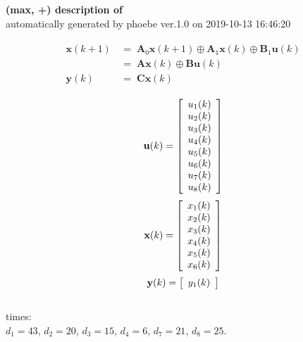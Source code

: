 \documentclass[11pt, a4paper, fleqn]{article}
\begin{document}
\noindent
\textbf{(max, +) description of} \texttt{\currfilebase} \\
automatically generated by phoebe ver.1.0 on 2019-10-13 16:46:20 

\begin{align}\begin{split}
\mathbf{x}(k+1) & \, = \; \mathbf{A}_{0}\mathbf{x}(k+1) \oplus \mathbf{A}_{1}\mathbf{x}(k) \oplus \mathbf{B}_{1}\mathbf{u}(k)\\
& \, = \; \mathbf{Ax}(k) \oplus \mathbf{Bu}(k)\\
\mathbf{y}(k) & \, = \; \mathbf{Cx}(k)
\end{split}\end{align}

\begin{equation*}
\mathbf{u}(k) = 
\left[\begin{array}{*{20}c}
  u_1(k) \\
  u_2(k) \\
  u_3(k) \\
  u_4(k) \\
  u_5(k) \\
  u_6(k) \\
  u_7(k) \\
  u_8(k) \\
\end{array}\right]
\end{equation*}
\begin{equation*}
\mathbf{x}(k) = 
\left[\begin{array}{*{20}c}
  x_1(k) \\
  x_2(k) \\
  x_3(k) \\
  x_4(k) \\
  x_5(k) \\
  x_6(k) \\
\end{array}\right]
\end{equation*}
\begin{equation*}
\mathbf{y}(k) = 
\left[\begin{array}{*{20}c}
  y_1(k) \\
\end{array}\right]
\end{equation*}
\noindent\\
times:\\
$d_1 = 43$, $d_2 = 20$, $d_3 = 15$, $d_4 = 6$, $d_7 = 21$, $d_8 = 25$.\\
\\
\end{document}
